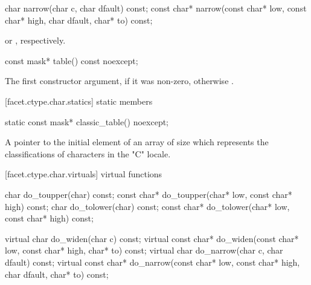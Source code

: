 %
\begin{itemdecl}
char        narrow(char c, char dfault) const;
const char* narrow(const char* low, const char* high,
                   char dfault, char* to) const;
\end{itemdecl}

\begin{itemdescr}
\pnum
\returns
{}%
or
%
,
respectively.
\end{itemdescr}

%
\begin{itemdecl}
const mask* table() const noexcept;
\end{itemdecl}

\begin{itemdescr}
\pnum
\returns
The first constructor argument, if it was non-zero, otherwise
.
\end{itemdescr}

[facet.ctype.char.statics]{ static members}

%
\begin{itemdecl}
static const mask* classic_table() noexcept;
\end{itemdecl}

\begin{itemdescr}
\pnum
\returns
A pointer to the initial element of an array of size
which represents the classifications of characters in the "C" locale.
\end{itemdescr}

[facet.ctype.char.virtuals]{ virtual functions}

%
%
%
%
\begin{codeblock}
char        do_toupper(char) const;
const char* do_toupper(char* low, const char* high) const;
char        do_tolower(char) const;
const char* do_tolower(char* low, const char* high) const;

virtual char        do_widen(char c) const;
virtual const char* do_widen(const char* low,
                             const char* high,
                             char* to) const;
virtual char        do_narrow(char c, char dfault) const;
virtual const char* do_narrow(const char* low,
                              const char* high,
                              char dfault, char* to) const;
\end{codeblock}

